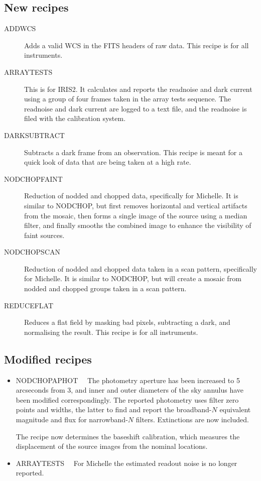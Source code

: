 \documentclass[twoside,11pt]{article}
\newcommand{\htmlref}[2]{#1}
\renewcommand{\_}{\texttt{\symbol{95}}}
\begin{document}
\subsection{New recipes}
\begin{description}
  \item [\htmlref{ADDWCS}{ADDWCS}]
    Adds a valid WCS in the FITS headers of raw data.  This recipe
    is for all instruments.
  \item [ARRAY\_TESTS]
    This is for IRIS2.  It calculates and reports the readnoise and
    dark current using a group of four frames taken in the array
    tests sequence.  The readnoise and dark current are logged to
    a text file, and the readnoise is filed with the calibration system.
  \item [\htmlref{DARK\_SUBTRACT}{DARK\_SUBTRACT}]
    Subtracts a dark frame from an observation.  This recipe is meant
    for a quick look of data that are being taken at a high rate.
  \item [\htmlref{NOD\_CHOP\_FAINT}{NOD\_CHOP\_FAINT}]
    Reduction of nodded and chopped data, specifically for Michelle.
    It is similar to \htmlref{NOD\_CHOP}{NOD\_CHOP}, but first removes
    horizontal and vertical artifacts from the mosaic, then forms a single
    image of the source using a median filter, and finally smooths the
    combined image to enhance the visibility of faint sources.
  \item [\htmlref{NOD\_CHOP\_SCAN}{NOD\_CHOP\_SCAN}]
    Reduction of nodded and chopped data taken in a scan pattern,
    specifically for Michelle.  It is similar to NOD\_CHOP, but will
    create a mosaic from nodded and chopped groups taken in a scan
    pattern.
  \item [\htmlref{REDUCE\_FLAT}{REDUCE\_FLAT}]
    Reduces a flat field by masking bad pixels, subtracting a dark,
    and normalising the result.  This recipe is for all instruments.
\end{description}

\subsection{Modified recipes}
\begin{itemize}
  \item \htmlref{NOD\_CHOP\_APHOT}{NOD\_CHOP\_APHOT}~~
    The photometry aperture has been increased to 5 arcseconds from 3,
    and inner and outer diameters of the sky annulus have been modified
    correspondingly.  The reported photometry uses filter zero points
    and widths, the latter to find and report the broadband-$N$
    equivalent magnitude and flux for narrowband-$N$ filters. 
    Extinctions are now included.
    
    The recipe now determines the baseshift calibration, which
    measures the displacement of the source images from the nominal
    locations.

  \item \htmlref{ARRAY\_TESTS}{ARRAY\_TESTS}~~
    For Michelle the estimated readout noise is no longer reported.
\end{itemize}
\end{document}
